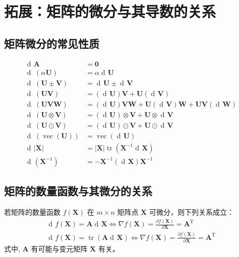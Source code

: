 \documentclass[UTF8,space=auto]{ctexart} %
\DeclareMathOperator{\diff}{d\!}
\begin{document}
\section{拓展：矩阵的微分与其导数的关系}
\subsection{矩阵微分的常见性质}
\begin{align}
\diff\mathbf{A}&=\mathbf{0} \\
\diff\,(\alpha \mathbf{U})&=\alpha \diff \mathbf{U} \\
\diff\,(\mathbf{U} \pm \mathbf{V})&=\diff \mathbf{U} \pm \diff \mathbf{V} \\
\diff\,(\mathbf{UV})&=(\diff \mathbf{U}) \mathbf{V}+\mathbf{U}(\diff \mathbf{V}) \\
\diff\,(\mathbf{UVW})&=(\diff \mathbf{U}) \mathbf{VW}+\mathbf{U}(\diff \mathbf{V}) \mathbf{W} + \mathbf{UV}(\diff \mathbf{W}) \\
\diff\,(\mathbf{U} \otimes \mathbf{V})&=(\diff \mathbf{U}) \otimes \mathbf{V}+\mathbf{U} \otimes \diff \mathbf{V} \\
\diff\,(\mathbf{U} \odot \mathbf{V})&=(\diff \mathbf{U}) \odot \mathbf{V}+\mathbf{U} \odot \diff \mathbf{V} \\
\diff\,(\operatorname{vec}(\mathbf{U}))&=\operatorname{vec}(\diff \mathbf{U}) \\
\diff|\mathbf{X}|&=|\mathbf{X}| \operatorname{tr}\left(\mathbf{X}^{-1} \diff \mathbf{X}\right) \\
\diff\left(\mathbf{X}^{-1}\right)&=-\mathbf{X}^{-1}(\diff \mathbf{X}) \mathbf{X}^{-1}
\end{align}

\subsection{矩阵的数量函数与其微分的关系}

\begin{lemma}\label{lem:differential}%
若矩阵的数量函数 $ f(\mathbf{X}) $ 在 $ m\times n $ 矩阵点 $ \mathbf{X} $ 可微分，则下列关系成立：
\begin{gather*}
\diff f(\mathbf{X})=\mathbf{A} \diff \mathbf{X} \iff \nabla f(\mathbf{X})=\frac{\partial f(\mathbf{X})}{\partial \mathbf{X}}=\mathbf{A}^{\mathrm{T}} \\
\diff f(\mathbf{X})=\operatorname{tr}(\mathbf{A} \diff \mathbf{X}) \iff \nabla f(\mathbf{X})=\frac{\partial f(\mathbf{X})}{\partial \mathbf{X}}=\mathbf{A}^{\mathrm{T}}
\end{gather*}
式中, $\mathbf{A}$ 有可能与变元矩阵 $\mathbf{X}$ 有关。
\end{lemma}
\end{document}

